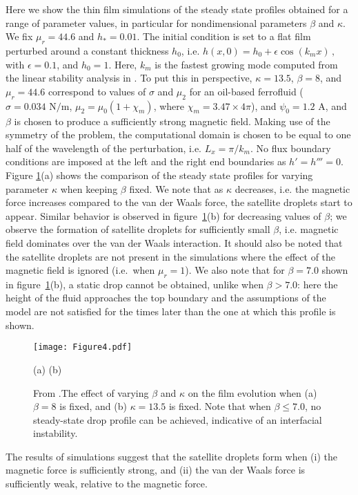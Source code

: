 Here we show the thin film simulations of the steady state profiles 
obtained for a range of parameter values, in particular for nondimensional 
parameters $\beta$ and $\kappa$. We fix $\mu_r = 44.6$ and $h_* = 0.01$.
The initial condition is set to a flat film perturbed around a constant thickness $h_0$, i.e.
$h\left( x, 0 \right) = h_0 + \epsilon \cos{\left( k_m x \right)}\, ,$
with $\epsilon = 0.1$, and $h_0 = 1$.  Here, $k_m$ is the fastest growing mode computed from 
the linear stability analysis in \cite{Seric2014}. 
To put this in perspective,  $\kappa = 13.5$, $\beta = 8$,  and $\mu_r = 44.6$  correspond 
to values of $\sigma$ and $\mu_2$ for an oil-based ferrofluid ($\sigma = 0.034 \mbox{ N/m}$, 
$\mu_2 = \mu_0 (1 + \chi_m)$, where $\chi_m = 3.47 \times 4\pi$), and $\psi_0 = 1.2 \mbox{ A}$, and $\beta$ is chosen to produce a sufficiently strong magnetic field.
Making use of the symmetry of the problem, the computational domain is chosen to be equal to one half of the wavelength of the perturbation, i.e. $ L_x = \pi/k_m$.
No flux boundary conditions are imposed at the left and the right end boundaries as $ h'= h''' = 0 $.
Figure \ref{fig:Figure4}(a) shows the comparison of the steady state profiles for varying parameter $\kappa$ when keeping $\beta$ fixed. We note that as $\kappa$ decreases, i.e. the magnetic force increases compared to the van der Waals force, the satellite
droplets start to appear. Similar behavior is observed in figure~\ref{fig:Figure4}(b) for decreasing values of $\beta$; we observe the formation of satellite 
droplets for sufficiently small $\beta$, i.e. magnetic field dominates over the van der Waals interaction. 
It should also be noted that the satellite droplets are not present in the simulations where the effect of the magnetic field is ignored (i.e.~when $\mu_r = 1 $). 
We also note that for $\beta = 7.0$ shown in figure~\ref{fig:Figure4}(b), a static drop cannot be obtained, unlike when $\beta > 7.0$: here the height of the 
fluid approaches the top boundary and the assumptions of the model are not satisfied for the times later than the one at which this profile is shown.
\begin{figure}
\begin{center}
\texttt{[image: Figure4.pdf]}
\end{center}
\hspace{34mm} (a) \hspace{61mm} (b)%
  \caption{From \cite{Seric2014}.The effect of varying $\beta$ and $\kappa$ on the film evolution 
                when (a) $\beta = 8$ is fixed, and (b) $\kappa = 13.5$ is fixed. 
                Note that when $\beta \le 7.0$, no steady-state drop profile can be achieved, 
                indicative of an interfacial instability.}
\label{fig:Figure4}
\end{figure}
The results of simulations suggest that  
the satellite droplets form when (i) the magnetic force is sufficiently strong, 
and (ii)  the van der Waals force is sufficiently 
weak, relative to the magnetic force. 







